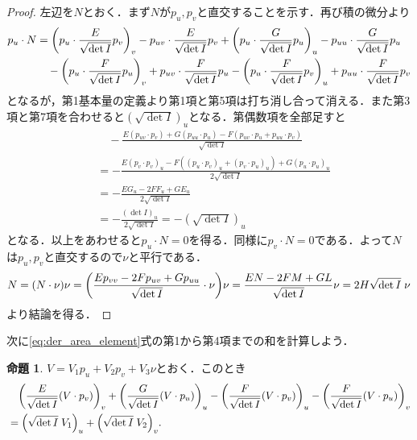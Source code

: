 \documentclass[a4j]{ltjsarticle}
\numberwithin{equation}{section}
\theoremstyle{definition}
\newtheorem{prop}[thm]{命題}
\begin{document}
\begin{proof}
    左辺を$N$とおく．まず$N$が$p_u,p_v$と直交することを示す．再び積の微分より
    \begin{align}
        p_u\cdot N&=\qty(p_u\cdot \frac{E}{\sqrt{\det I}}p_v)_v-p_{uv}\cdot \frac{E}{\sqrt{\det I}}p_v+\qty(p_u\cdot \frac{G}{\sqrt{\det I}}p_u)_u-p_{uu}\cdot \frac{G}{\sqrt{\det I}}p_u\\
        &\quad -\qty(p_u\cdot \frac{F}{\sqrt{\det I}}p_u)_v+p_{uv}\cdot \frac{F}{\sqrt{\det I}}p_u-\qty(p_u\cdot \frac{F}{\sqrt{\det I}}p_v)_u+p_{uu}\cdot \frac{F}{\sqrt{\det I}}p_v
    \end{align}
    となるが，第1基本量の定義より第1項と第5項は打ち消し合って消える．また第3項と第7項を合わせると$(\sqrt{\det I})_u$となる．第偶数項を全部足すと
    \begin{align}
        &\quad -\frac{E(p_{uv}\cdot p_v)+G(p_{uu}\cdot p_u)-F(p_{uv}\cdot p_u+p_{uu}\cdot p_v)}{\sqrt{\det I}}\\
        &=-\frac{E(p_v\cdot p_v)_u-F((p_u\cdot p_v)_u+(p_v\cdot p_u)_u)+G(p_u\cdot p_u)_u}{2\sqrt{\det I}}\\
        &=-\frac{EG_u-2FF_u+GE_u}{2\sqrt{\det I}}\\
        &=-\frac{(\det I)_u}{2\sqrt{\det I}}=-(\sqrt{\det I})_u
    \end{align}
    となる．以上をあわせると$p_u\cdot N=0$を得る．同様に$p_v\cdot N=0$である．よって$N$は$p_u,p_v$と直交するので$\nu$と平行である．
    \begin{equation}
        N=(N\cdot \nu)\nu=\qty(\frac{Ep_{vv}-2Fp_{uv}+Gp_{uu}}{\sqrt{\det I}}\cdot \nu)\nu=\frac{EN-2FM+GL}{\sqrt{\det I}}\nu =2H\sqrt{\det I}\;\nu
    \end{equation}
    より結論を得る．
\end{proof}
次に\eqref{eq:der_area_element}式の第1から第4項までの和を計算しよう．
\begin{prop}\label{prop:prep2}
    $V=V_1p_u+V_2p_v+V_3\nu$とおく．このとき 
    \begin{align}
        &\quad \qty(\frac{E}{\sqrt{\det I}}(V\cdot p_v))_v+\qty(\frac{G}{\sqrt{\det I}}(V\cdot p_u))_u-\qty(\frac{F}{\sqrt{\det I}}(V\cdot p_v))_u-\qty(\frac{F}{\sqrt{\det I}}(V\cdot p_u))_v\\
        &=\qty(\sqrt{\det I}\; V_1)_u+\qty(\sqrt{\det I}\;V_2)_v.
    \end{align}
\end{prop}
\end{document}
